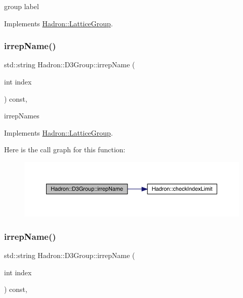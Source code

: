 group label 

Implements \mbox{\hyperlink{structHadron_1_1LatticeGroup_a82208a322bf1b1db489f16af38e70087}{Hadron\+::\+Lattice\+Group}}.

\mbox{\label{structHadron_1_1D3Group_a3e60ca3001ddc0176179107cfed2d621}} 
\subsubsection{\texorpdfstring{irrepName()}{irrepName()}\hspace{0.1cm}{\footnotesize\ttfamily [1/3]}}
{\footnotesize\ttfamily std\+::string Hadron\+::\+D3\+Group\+::irrep\+Name (\begin{DoxyParamCaption}\item[{int}]{index }\end{DoxyParamCaption}) const\hspace{0.3cm}{\ttfamily [inline]}, {\ttfamily [virtual]}}

irrep\+Names 

Implements \mbox{\hyperlink{structHadron_1_1LatticeGroup_a4bc5620218c2a73157e19bc4451fe746}{Hadron\+::\+Lattice\+Group}}.

Here is the call graph for this function\+:
\nopagebreak
\begin{figure}[H]
\begin{center}
\leavevmode
\includegraphics[width=350pt]{de/de1/structHadron_1_1D3Group_a3e60ca3001ddc0176179107cfed2d621_cgraph}
\end{center}
\end{figure}
\mbox{\label{structHadron_1_1D3Group_a3e60ca3001ddc0176179107cfed2d621}} 
\subsubsection{\texorpdfstring{irrepName()}{irrepName()}\hspace{0.1cm}{\footnotesize\ttfamily [2/3]}}
{\footnotesize\ttfamily std\+::string Hadron\+::\+D3\+Group\+::irrep\+Name (\begin{DoxyParamCaption}\item[{int}]{index }\end{DoxyParamCaption}) const\hspace{0.3cm}{\ttfamily [inline]}, {\ttfamily [virtual]}}

